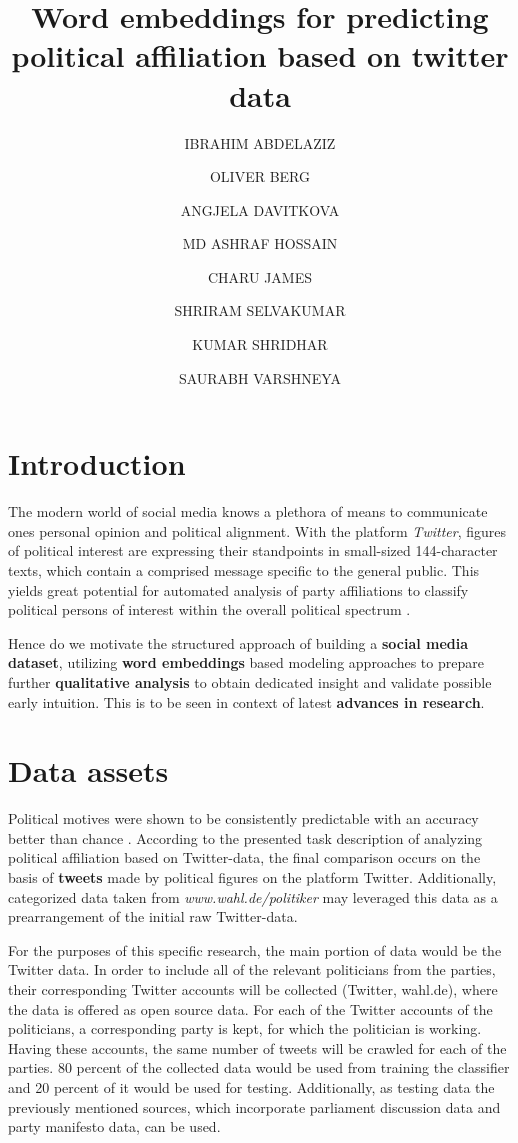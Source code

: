 \documentclass[10pt, oneside]{article}
\title{Word embeddings for predicting political affiliation based on twitter data}
\author[]{IBRAHIM ABDELAZIZ}
\author[]{OLIVER BERG}
\author[]{ANGJELA DAVITKOVA}
\author[]{MD ASHRAF HOSSAIN}
\author[]{CHARU JAMES}
\author[]{SHRIRAM SELVAKUMAR}
\author[]{KUMAR SHRIDHAR}
\author[]{SAURABH VARSHNEYA}
\affil[1]{Technische Universität Kaiserslautern}
\begin{document}
\maketitle
\begin{multicols}{2}


\section{Introduction}

The modern world of social media knows a plethora of means to communicate ones personal opinion and political alignment. With the platform \textit{Twitter}, figures of political interest are expressing their standpoints in small-sized 144-character texts, which contain a comprised message specific to the general public. This yields great potential for automated analysis of party affiliations to classify political persons of interest within the overall political spectrum \cite{Biessmann2017}.

Hence do we motivate the structured approach of building a \textbf{social media dataset}, utilizing \textbf{word embeddings} \cite{Pelevinala2016} based modeling approaches to prepare further \textbf{qualitative analysis} to obtain dedicated insight and validate possible early intuition.
This is to be seen in context of latest \textbf{advances in research}.


\section{Data assets}

Political motives were shown to be consistently predictable with an accuracy better than chance \cite{Biessmann2017}.
According to the presented task description of analyzing political affiliation based on Twitter-data, the final comparison occurs on the basis of \textbf{tweets} made by political figures on the platform Twitter.
Additionally, categorized data taken from \textit{www.wahl.de/politiker} may leveraged this data as a prearrangement of the initial raw Twitter-data.

For the purposes of this specific research, the main portion of data would be the Twitter data. In order to include all of the relevant politicians from the parties, their corresponding Twitter accounts will be collected (Twitter, wahl.de), where the data is offered as open source data.
For each of the Twitter accounts of the politicians, a corresponding party is kept, for which the politician is working. Having these accounts, the same number of tweets will be crawled for each of the parties. 80 percent of the collected data would be used from training the classifier and 20 percent of it would be used for testing.
Additionally, as testing data the previously mentioned sources, which incorporate parliament discussion data and party manifesto data, can be used. 



\end{multicols}
\end{document}
